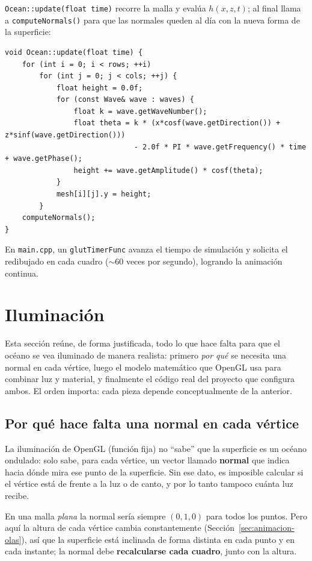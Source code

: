 ﻿\documentclass[11pt]{article}
\begin{document}
\texttt{Ocean::update(float time)} recorre la malla y evalúa $h(x,z,t)$; al
final llama a \texttt{computeNormals()} para que las normales queden al día
con la nueva forma de la superficie:

\begin{lstlisting}
void Ocean::update(float time) {
    for (int i = 0; i < rows; ++i)
        for (int j = 0; j < cols; ++j) {
            float height = 0.0f;
            for (const Wave& wave : waves) {
                float k = wave.getWaveNumber();
                float theta = k * (x*cosf(wave.getDirection()) + z*sinf(wave.getDirection()))
                              - 2.0f * PI * wave.getFrequency() * time + wave.getPhase();
                height += wave.getAmplitude() * cosf(theta);
            }
            mesh[i][j].y = height;
        }
    computeNormals();
}
\end{lstlisting}

En \texttt{main.cpp}, un \texttt{glutTimerFunc} avanza el tiempo de simulación
y solicita el redibujado en cada cuadro (\(\sim\)60 veces por segundo),
logrando la animación continua.

\section{Iluminación}
\label{sec:iluminacion}

Esta sección reúne, de forma justificada, todo lo que hace falta para que el
océano se vea iluminado de manera realista: primero \emph{por qué} se necesita
una normal en cada vértice, luego el modelo matemático que OpenGL usa para
combinar luz y material, y finalmente el código real del proyecto que
configura ambos. El orden importa: cada pieza depende conceptualmente de la
anterior.

\subsection{Por qué hace falta una normal en cada vértice}
\label{sec:normales}

La iluminación de OpenGL (función fija) no ``sabe'' que la superficie es un
océano ondulado: solo sabe, para cada vértice, un vector llamado
\textbf{normal} que indica hacia dónde mira ese punto de la superficie. Sin
ese dato, es imposible calcular si el vértice está de frente a la luz o de
canto, y por lo tanto tampoco cuánta luz recibe.

En una malla \emph{plana} la normal sería siempre $(0,1,0)$ para todos los
puntos. Pero aquí la altura de cada vértice cambia constantemente
(Sección~\ref{sec:animacion-olas}), así que la superficie está inclinada de
forma distinta en cada punto y en cada instante; la normal debe
\textbf{recalcularse cada cuadro}, junto con la altura.
\end{document}
